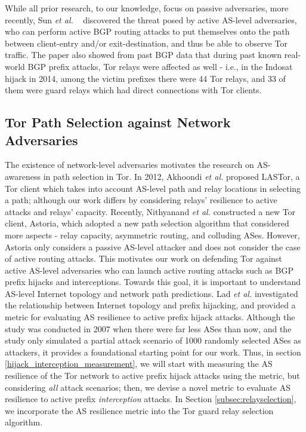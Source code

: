 While all prior research, to our knowledge, focus on passive adversaries, more recently, Sun \emph{et al.} ~\cite{sun2015raptor} discovered the threat posed by active AS-level adversaries, who can perform active BGP routing attacks to put themselves onto the path between client-entry and/or exit-destination, and thus be able to observe Tor traffic. The paper also showed from past BGP data that during past known real-world BGP prefix attacks, Tor relays were affected as well - i.e., in the Indosat hijack in 2014, among the victim prefixes there were 44 Tor relays, and 33 of them were guard relays which had direct connections with Tor clients. 

\subsection{Tor Path Selection against Network Adversaries}
The existence of network-level adversaries motivates the research on AS-awareness in path selection in Tor. In 2012, Akhoondi \emph{et al.} \cite{akhoondi2012lastor} proposed LASTor, a Tor client which takes into account AS-level path and relay locations in selecting a path; although our work differs by considering relays' resilience to active attacks and relays' capacity. Recently, Nithyanand \emph{et al.} \cite{starov2015measuring} constructed a new Tor client, Astoria, which adopted a new path selection algorithm that considered more aspects - relay capacity, asymmetric routing, and colluding ASes. However, Astoria only considers a passive AS-level attacker and does not consider the case of active routing attacks.
This motivates our work on defending Tor against active AS-level adversaries who can launch active routing attacks such as BGP prefix hijacks and interceptions. Towards this goal, it is important to understand AS-level Internet topology and network path predictions. Lad \emph{et al.} \cite{lad2007understanding} investigated the relationship between Internet topology and prefix hijacking, and provided a metric for evaluating AS resilience to active prefix hijack attacks. Although the study was conducted in 2007 when there were far less ASes than now, and the study only simulated a partial attack scenario of 1000 randomly selected ASes as attackers, it provides a foundational starting point for our work. Thus, in section \ref{hijack_interception_measurement}, we will start with measuring the AS resilience of the Tor network to active prefix hijack attacks using the metric, but considering \emph{all} attack scenarios; then, we devise a novel metric to evaluate AS resilience to active prefix \emph{interception} attacks. In Section \ref{subsec:relayselection}, we incorporate the AS resilience metric into the Tor guard relay selection algorithm. 


